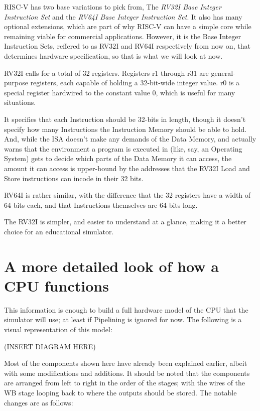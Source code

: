 \documentclass[12pt,twoside]{reedthesis}
\begin{document}
RISC-V has two base variations to pick from, The \textit{RV32I Base Integer Instruction Set} and the \textit{RV64I Base Integer Instruction Set}. It also has many optional extensions, which are part of why RISC-V can have a simple core while remaining viable for commercial applications. However, it is the Base Integer Instruction Sets, reffered to as RV32I and RV64I respectively from now on, that determines hardware specification, so that is what we will look at now.

RV32I calls for a total of 32 registers. Registers r1 through r31 are general-purpose registers, each capable of holding a 32-bit-wide integer value. r0 is a special register hardwired to the constant value 0, which is useful for many situations.

It specifies that each Instruction should be 32-bits in length, though it doesn't specify how many Instructions the Instruction Memory should be able to hold. And, while the ISA doesn't make any demands of the Data Memory, and actually warns that the environment a program is executed in (like, say, an Operating System) gets to decide which parts of the Data Memory it can access, the amount it can access is upper-bound by the addresses that the RV32I Load and Store instructions can incode in their 32 bits.

RV64I is rather similar, with the difference that the 32 registers have a width of 64 bits each, and that Instructions themselves are 64-bits long.

The RV32I is simpler, and easier to understand at a glance, making it a better choice for an educational simulator.

\section{A more detailed look of how a CPU functions}

This information is enough to build a full hardware model of the CPU that the simulator will use; at least if Pipelining is ignored for now. The following is a visual representation of this model:

(INSERT DIAGRAM HERE)

Most of the components shown here have already been explained earlier, albeit with some modifications and additions. It should be noted that the components are arranged from left to right in the order of the stages; with the wires of the WB stage looping back to where the outputs should be stored. The notable changes are as follows:
\end{document}
